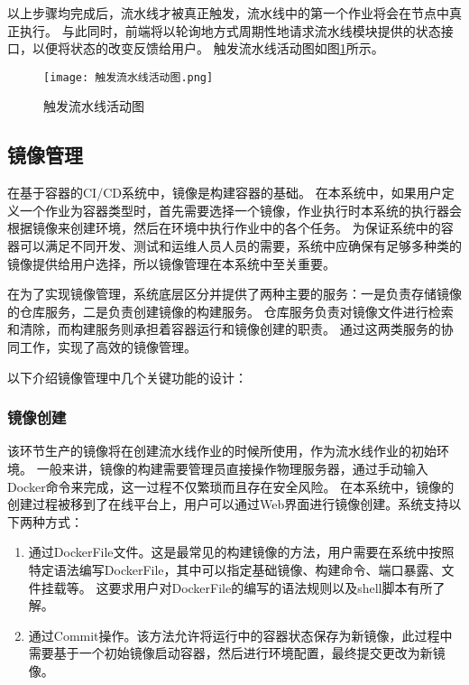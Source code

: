 以上步骤均完成后，流水线才被真正触发，流水线中的第一个作业将会在节点中真正执行。
与此同时，前端将以轮询地方式周期性地请求流水线模块提供的状态接口，以便将状态的改变反馈给用户。
触发流水线活动图如图\ref{fig:触发流水线活动图}所示。

\begin{figure}[h]
  \centering
  \texttt{[image: 触发流水线活动图.png]}
  \caption{触发流水线活动图}
  \label{fig:触发流水线活动图}
\end{figure}

\subsection{镜像管理}
\label{subsec:镜像管理}

在基于容器的CI/CD系统中，镜像是构建容器的基础。
在本系统中，如果用户定义一个作业为容器类型时，首先需要选择一个镜像，作业执行时本系统的执行器会根据镜像来创建环境，然后在环境中执行作业中的各个任务。
为保证系统中的容器可以满足不同开发、测试和运维人员人员的需要，系统中应确保有足够多种类的镜像提供给用户选择，所以镜像管理在本系统中至关重要。

在为了实现镜像管理，系统底层区分并提供了两种主要的服务：一是负责存储镜像的仓库服务，二是负责创建镜像的构建服务。
仓库服务负责对镜像文件进行检索和清除，而构建服务则承担着容器运行和镜像创建的职责。
通过这两类服务的协同工作，实现了高效的镜像管理。

以下介绍镜像管理中几个关键功能的设计：

\subsubsection{镜像创建}

该环节生产的镜像将在创建流水线作业的时候所使用，作为流水线作业的初始环境。
一般来讲，镜像的构建需要管理员直接操作物理服务器，通过手动输入Docker命令来完成，这一过程不仅繁琐而且存在安全风险。
在本系统中，镜像的创建过程被移到了在线平台上，用户可以通过Web界面进行镜像创建。系统支持以下两种方式：
\begin{enumerate}
  \item 通过DockerFile文件。这是最常见的构建镜像的方法，用户需要在系统中按照特定语法编写DockerFile，其中可以指定基础镜像、构建命令、端口暴露、文件挂载等。
  这要求用户对DockerFile的编写的语法规则以及shell脚本有所了解。
  \item 通过Commit操作。该方法允许将运行中的容器状态保存为新镜像，此过程中需要基于一个初始镜像启动容器，然后进行环境配置，最终提交更改为新镜像。
\end{enumerate}

